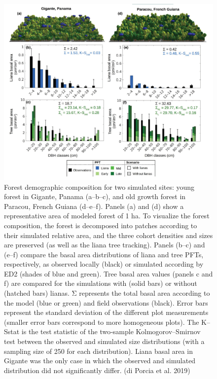 \documentclass[
  12pt,
  oneside]{book}
\begin{document}
\begin{figure}

{\centering \includegraphics[width=0.8\linewidth]{figures/chap7/f723_porcia2} 

}

\caption{Forest demographic composition for two simulated sites: young forest in Gigante, Panama (a–b–c), and old growth forest in Paracou, French Guiana (d–e–f). Panels (a) and (d) show a representative area of modeled forest of 1 ha. To visualize the forest composition, the forest is decomposed into patches according to their simulated relative area, and the three cohort densities and sizes are preserved (as well as the liana tree tracking). Panels (b–c) and (e–f) compare the basal area distributions of liana and tree PFTs, respectively, as observed locally (black) or simulated according by ED2 (shades of blue and green). Tree basal area values (panels c and f) are compared for the simulations with (solid bars) or without (hatched bars) lianas. Σ represents the total basal area according to the model (blue or green) and field observations (black). Error bars represent the standard deviation of the different plot measurements (smaller error bars correspond to more homogeneous plots). The K–Sstat is the test statistic of the two‐sample Kolmogorov–Smirnov test between the observed and simulated size distributions (with a sampling size of 250 for each distribution). Liana basal area in Gigante was the only case in which the observed and simulated distribution did not significantly differ. (di Porcia et al. 2019)}\label{fig:f723}
\end{figure}
\end{document}
